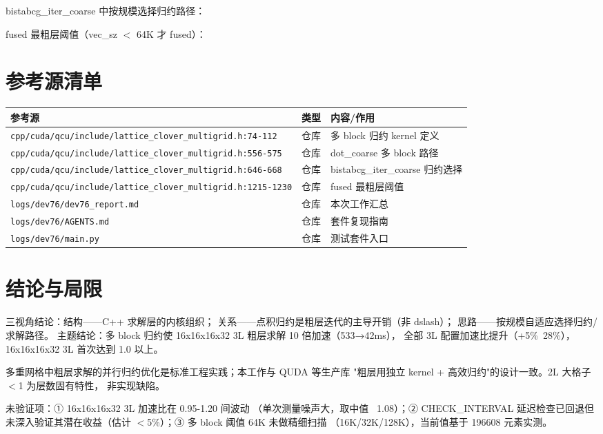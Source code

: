 \documentclass[UTF8]{ctexart}
\begin{document}
bistabcg\_iter\_coarse 中按规模选择归约路径：


fused 最粗层阈值（vec\_sz $<$ 64K 才 fused）：


\section{参考源清单}
\begin{xltabular}{\textwidth}{llX}
\toprule
\textcolor{evidence}{参考源} & 类型 & 内容/作用 \\
\midrule
\endhead
\texttt{\nolinkurl{cpp/cuda/qcu/include/lattice_clover_multigrid.h:74-112}} & 仓库 & 多 block 归约 kernel 定义 \\
\texttt{\nolinkurl{cpp/cuda/qcu/include/lattice_clover_multigrid.h:556-575}} & 仓库 & dot\_coarse 多 block 路径 \\
\texttt{\nolinkurl{cpp/cuda/qcu/include/lattice_clover_multigrid.h:646-668}} & 仓库 & bistabcg\_iter\_coarse 归约选择 \\
\texttt{\nolinkurl{cpp/cuda/qcu/include/lattice_clover_multigrid.h:1215-1230}} & 仓库 & fused 最粗层阈值 \\
\texttt{\nolinkurl{logs/dev76/dev76_report.md}} & 仓库 & 本次工作汇总 \\
\texttt{\nolinkurl{logs/dev76/AGENTS.md}} & 仓库 & 套件复现指南 \\
\texttt{\nolinkurl{logs/dev76/main.py}} & 仓库 & 测试套件入口 \\
\bottomrule
\end{xltabular}

\section{结论与局限}
\begin{conclbox}
三视角结论：\textcolor{struct}{结构}——C++ 求解层的内核组织；
\textcolor{relation}{关系}——点积归约是粗层迭代的主导开销（非 dslash）；
\textcolor{idea}{思路}——按规模自适应选择归约/求解路径。
主题结论：多 block 归约使 16x16x16x32 3L 粗层求解 10 倍加速（533→42ms），
全部 3L 配置加速比提升（+5\%~28\%），16x16x16x32 3L 首次达到 1.0 以上。
\end{conclbox}
\begin{refbox}
多重网格中粗层求解的并行归约优化是标准工程实践；本工作与 QUDA 等生产库
"粗层用独立 kernel + 高效归约"的设计一致。2L 大格子 $<$1 为层数固有特性，
非实现缺陷。
\end{refbox}
\begin{warnbox}
\textcolor{warn}{未验证}项：① 16x16x16x32 3L 加速比在 0.95-1.20 间波动
（单次测量噪声大，取中值 ~1.08）；② CHECK\_INTERVAL 延迟检查已回退但
未深入验证其潜在收益（估计 $<$5\%）；③ 多 block 阈值 64K 未做精细扫描
（16K/32K/128K），当前值基于 196608 元素实测。
\end{warnbox}
\end{document}
